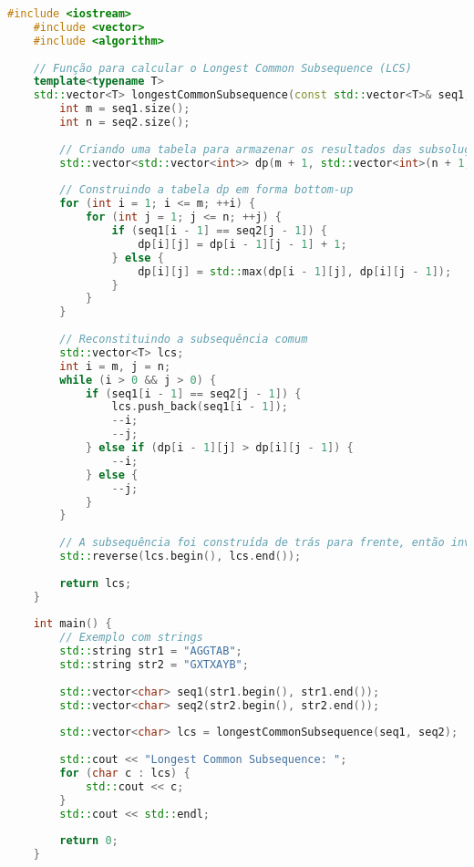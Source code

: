 \documentclass{article}
\begin{document}
\begin{lstlisting}[language=C++, caption=Longest Common Subsequence]
    #include <iostream>
    #include <vector>
    #include <algorithm>
    
    // Função para calcular o Longest Common Subsequence (LCS)
    template<typename T>
    std::vector<T> longestCommonSubsequence(const std::vector<T>& seq1, const std::vector<T>& seq2) {
        int m = seq1.size();
        int n = seq2.size();
    
        // Criando uma tabela para armazenar os resultados das subsoluções
        std::vector<std::vector<int>> dp(m + 1, std::vector<int>(n + 1, 0));
    
        // Construindo a tabela dp em forma bottom-up
        for (int i = 1; i <= m; ++i) {
            for (int j = 1; j <= n; ++j) {
                if (seq1[i - 1] == seq2[j - 1]) {
                    dp[i][j] = dp[i - 1][j - 1] + 1;
                } else {
                    dp[i][j] = std::max(dp[i - 1][j], dp[i][j - 1]);
                }
            }
        }
    
        // Reconstituindo a subsequência comum
        std::vector<T> lcs;
        int i = m, j = n;
        while (i > 0 && j > 0) {
            if (seq1[i - 1] == seq2[j - 1]) {
                lcs.push_back(seq1[i - 1]);
                --i;
                --j;
            } else if (dp[i - 1][j] > dp[i][j - 1]) {
                --i;
            } else {
                --j;
            }
        }
    
        // A subsequência foi construída de trás para frente, então invertê-la
        std::reverse(lcs.begin(), lcs.end());
    
        return lcs;
    }
    
    int main() {
        // Exemplo com strings
        std::string str1 = "AGGTAB";
        std::string str2 = "GXTXAYB";
        
        std::vector<char> seq1(str1.begin(), str1.end());
        std::vector<char> seq2(str2.begin(), str2.end());
        
        std::vector<char> lcs = longestCommonSubsequence(seq1, seq2);
    
        std::cout << "Longest Common Subsequence: ";
        for (char c : lcs) {
            std::cout << c;
        }
        std::cout << std::endl;
    
        return 0;
    } 
\end{lstlisting}
\end{document}
